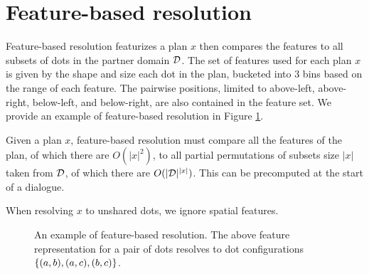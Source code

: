 \documentclass[11pt]{article}
\begin{document}
\section{Feature-based resolution}
\label{sec:feature-resolution}
Feature-based resolution featurizes a plan $x$
then compares the features to all subsets of dots
in the partner domain $\mathcal{D}$.
The set of features used for each plan $x$ is given by the shape and size
each dot in the plan, bucketed into 3 bins based on the range of each feature.
The pairwise positions, limited to above-left, above-right, below-left, and below-right, are also contained in the feature set.
We provide an example of feature-based resolution in Figure
\ref{fig:resolution-example}.

Given a plan $x$, feature-based resolution
must compare all the features of the plan,
of which there are $O(|x|^2)$,
to all partial permutations of subsets size $|x|$ taken from $\mathcal{D}$,
of which there are $O(|\mathcal{D}|^{|x|})$.
This can be precomputed at the start of a dialogue.

When resolving $x$ to unshared dots, we ignore spatial features.

\begin{figure}[t]
\setlength{\abovecaptionskip}{0pt}

\centering

\vspace{1em}
\caption{
An example of feature-based resolution.
The above feature representation for a pair of dots
resolves to dot configurations $\left\{(a,b), (a,c), (b,c)\right\}$.
}
\label{fig:resolution-example}
\end{figure}
\end{document}
